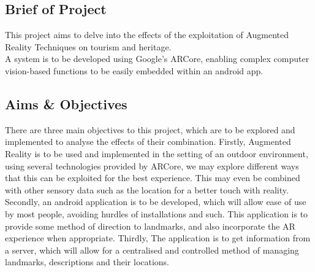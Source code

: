 \subsection{Brief of Project}
This project aims to delve into the effects of the exploitation of Augmented Reality Techniques on tourism and heritage.\\
A system is to be developed using Google's ARCore, enabling complex computer vision-based functions to be easily embedded within an android app. 
\subsection{Aims \& Objectives}
There are three main objectives to this project, which are to be explored and implemented to analyse the effects of their combination. 
Firstly, Augmented Reality is to be used and implemented in the setting of an outdoor environment, using several technologies provided by ARCore,
we may explore different ways that this can be exploited for the best experience. This may even be combined with other sensory data such 
as the location for a better touch with reality. Secondly, an android application is to be developed, which will allow ease of use by most people, avoiding hurdles of 
installations and such. This application is to provide some method of direction to landmarks, and also incorporate the AR experience when 
appropriate. Thirdly, The application is to get information from a server, which will allow for a centralised and controlled method of managing 
landmarks, descriptions and their locations.  

